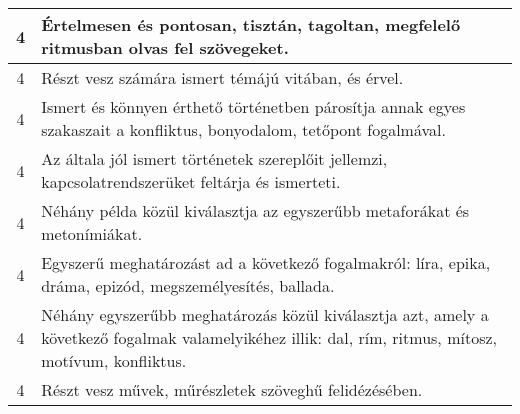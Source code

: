 \begin{longtable}{c | p{} }
                                          4 &  Értelmesen és pontosan, tisztán, tagoltan, megfelelő ritmusban olvas fel szövegeket. \\ \hline
                                          4 &  Részt vesz számára ismert témájú vitában, és érvel. \\ \hline
                                          4 &  Ismert és könnyen érthető történetben párosítja annak egyes szakaszait a konfliktus, bonyodalom, tetőpont fogalmával. \\ \hline
                                          4 &  Az általa jól ismert történetek szereplőit jellemzi, kapcsolatrendszerüket feltárja és ismerteti. \\ \hline
                                          4 &  Néhány példa közül kiválasztja az egyszerűbb metaforákat és metonímiákat. \\ \hline
                                          4 &  Egyszerű meghatározást ad a következő fogalmakról: líra, epika, dráma, epizód, megszemélyesítés, ballada. \\ \hline
                                          4 &  Néhány egyszerűbb meghatározás közül kiválasztja azt, amely a következő fogalmak valamelyikéhez illik: dal, rím, ritmus, mítosz, motívum, konfliktus. \\ \hline
                                          4 &  Részt vesz művek, műrészletek szöveghű felidézésében. \\ \hline
                                      
                        \end{longtable}
            \clearpage

